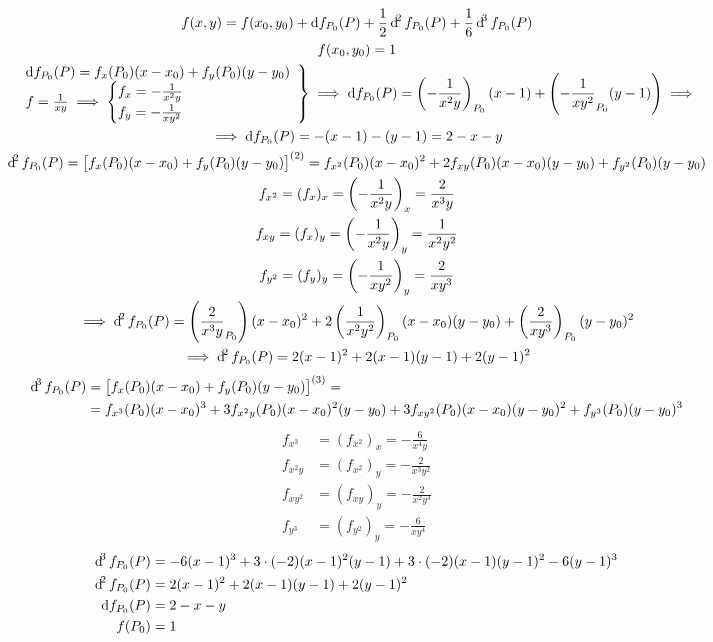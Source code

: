 \documentclass[11pt,a4paper,titlepage]{article}
\begin{document}
\begin{gather*}
f(x,y) = f(x_0,y_0) + \dif f_{P_0}(P) + \frac{1}{2}\dif^2 f_{P_0}(P) + \frac{1}{6} \dif^3 f_{P_0}(P) \\
f(x_0,y_0) = 1 \\ \left.
\begin{array}{l}
\dif f_{P_0}(P)=f_x(P_0)(x-x_0)+f_y(P_0)(y-y_0) \\
f=\frac{1}{xy} \implies \begin{cases}
f_x = -\frac{1}{x^2y} \\ f_y = -\frac{1}{xy^2}
\end{cases}
\end{array} \right\rbrace \implies
\dif f_{P_0}(P)= \left(-\frac{1}{x^2y} \right)_{P_0}(x-1) + \left(
-\frac{1}{xy^2}_{P_0}(y-1)
\right) \implies \\
\implies \dif f_{P_0}(P) = -(x-1)-(y-1) = 2-x-y\\
\dif^2f_{P_0}(P) = \left[
f_x(P_0)(x-x_0)+f_y(P_0)(y-y_0)
\right]^{(2)} =
f_{x^2}(P_0)(x-x_0)^2+2f_{xy}(P_0)(x-x_0)(y-y_0)+f_{y^2}(P_0)(y-y_0) \\
f_{x^2} = (f_x)_x = \left(-\frac{1}{x^2y} \right)_x = \frac{2}{x^3y} \\
f_{xy} = (f_x)_y = \left(-\frac{1}{x^2y} \right)_y = \frac{1}{x^2y^2} \\
f_{y^2} = (f_y)_y = \left(-\frac{1}{xy^2} \right)_y = \frac{2}{xy^3} \\
\implies \dif^2 f_{P_0}(P) = \left(
\frac{2}{x^3y}_{P_0}\right)(x-x_0)^2+2\left(
\frac{1}{x^2y^2}\right)_{P_0}(x-x_0)(y-y_0)+\left(
\frac{2}{xy^3}
\right)_{P_0}(y-y_0)^2 \\
\implies \dif^2 f_{P_0}(P) = 2(x-1)^2+2(x-1)(y-1)+2(y-1)^2
\end{gather*}
\begin{align*}
\dif^3 f_{P_0}(P) &= \left[
f_x(P_0)(x-x_0)+f_y(P_0)(y-y_0)
\right]^{(3)} = \\
&= f_{x^3}(P_0)(x-x_0)^3+3f_{x^2y}(P_0)(x-x_0)^2(y-y_0)+3f_{xy^2}(P_0)(x-x_0)(y-y_0)^2 + f_{y^3}(P_0)(y-y_0)^3
\end{align*}
\begin{align*}
f_{x^3} &= (f_{x^2})_x = -\frac{6}{x^4y}\\
f_{x^2y} &= (f_{x^2})_y = -\frac{2}{x^3y^2}\\
f_{xy^2} &= (f_{xy})_y = -\frac{2}{x^2y^3}\\
f_{y^3} &= (f_{y^2})_y = -\frac{6}{xy^4}
\end{align*}
\begin{align*}
\dif^3 f_{P_0}(P) &= -6(x-1)^3+3\cdot(-2)(x-1)^2(y-1) + 3\cdot(-2)(x-1)(y-1)^2-6(y-1)^3\\
\dif^2 f_{P_0}(P) &= 2(x-1)^2+2(x-1)(y-1)+2(y-1)^2 \\
\dif f_{P_0}(P)   &= 2-x-y \\
f(P_0) &= 1
\end{align*}
\end{document}
